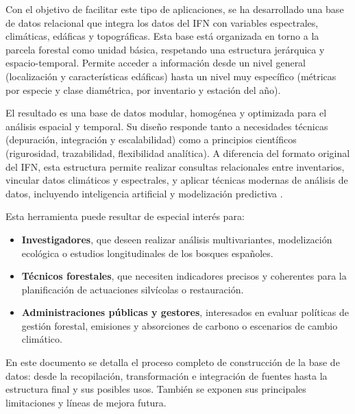 \medskip

Con el objetivo de facilitar este tipo de aplicaciones, se ha desarrollado una base de datos relacional que integra los datos del IFN con variables espectrales, climáticas, edáficas y topográficas. Esta base está organizada en torno a la parcela forestal como unidad básica, respetando una estructura jerárquica y espacio-temporal. Permite acceder a información desde un nivel general (localización y características edáficas) hasta un nivel muy específico (métricas por especie y clase diamétrica, por inventario y estación del año).

\medskip

El resultado es una base de datos modular, homogénea y optimizada para el análisis espacial y temporal. Su diseño responde tanto a necesidades técnicas (depuración, integración y escalabilidad) como a principios científicos (rigurosidad, trazabilidad, flexibilidad analítica). A diferencia del formato original del IFN, esta estructura permite realizar consultas relacionales entre inventarios, vincular datos climáticos y espectrales, y aplicar técnicas modernas de análisis de datos, incluyendo inteligencia artificial y modelización predictiva \cite{copernicus_api, miteco_abexante_2025}.


Esta herramienta puede resultar de especial interés para:
\begin{itemize}
    \item \textbf{Investigadores}, que deseen realizar análisis multivariantes, modelización ecológica o estudios longitudinales de los bosques españoles.
    \item \textbf{Técnicos forestales}, que necesiten indicadores precisos y coherentes para la planificación de actuaciones silvícolas o restauración.
    \item \textbf{Administraciones públicas y gestores}, interesados en evaluar políticas de gestión forestal, emisiones y absorciones de carbono o escenarios de cambio climático.
\end{itemize}

En este documento se detalla el proceso completo de construcción de la base de datos: desde la recopilación, transformación e integración de fuentes hasta la estructura final y sus posibles usos. También se exponen sus principales limitaciones y líneas de mejora futura.